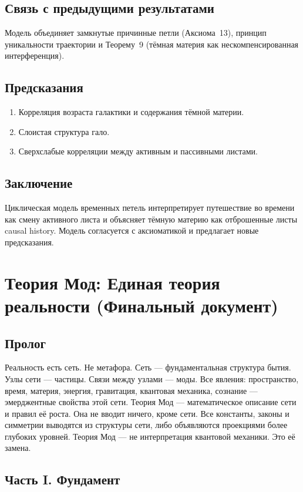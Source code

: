 \documentclass[12pt,a4paper]{article}
\begin{document}
\subsection{Связь с предыдущими результатами}
Модель объединяет замкнутые причинные петли (Аксиома~13), принцип уникальности траектории и Теорему~9 (тёмная материя как нескомпенсированная интерференция).

\subsection{Предсказания}
\begin{enumerate}
    \item Корреляция возраста галактики и содержания тёмной материи.
    \item Слоистая структура гало.
    \item Сверхслабые корреляции между активным и пассивными листами.
\end{enumerate}

\subsection{Заключение}
Циклическая модель временных петель интерпретирует путешествие во времени как смену активного листа и объясняет тёмную материю как отброшенные листы causal history. Модель согласуется с аксиоматикой и предлагает новые предсказания.

\newpage
\section{Теория Мод: Единая теория реальности (Финальный документ)}

\subsection*{Пролог}
Реальность есть сеть. Не метафора. Сеть --- фундаментальная структура бытия. Узлы сети --- частицы. Связи между узлами --- моды. Все явления: пространство, время, материя, энергия, гравитация, квантовая механика, сознание --- эмерджентные свойства этой сети. Теория Мод --- математическое описание сети и правил её роста. Она не вводит ничего, кроме сети. Все константы, законы и симметрии выводятся из структуры сети, либо объявляются проекциями более глубоких уровней. Теория Мод --- не интерпретация квантовой механики. Это её замена.

\subsection{Часть I. Фундамент}
\end{document}
